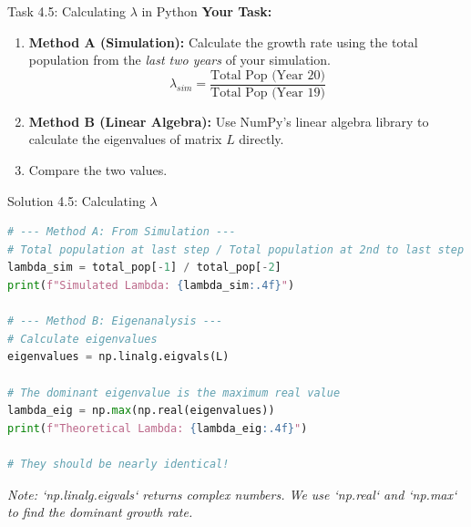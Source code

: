 \begin{frame}{Task 4.5: Calculating $\lambda$ in Python}
    \textbf{Your Task:}
    \begin{enumerate}
        \item \textbf{Method A (Simulation):} Calculate the growth rate using the total population from the \textit{last two years} of your simulation.
        $$ \lambda_{sim} = \frac{\text{Total Pop (Year 20)}}{\text{Total Pop (Year 19)}} $$
        
        \item \textbf{Method B (Linear Algebra):} Use NumPy's linear algebra library to calculate the eigenvalues of matrix $L$ directly.
        \item Compare the two values.
    \end{enumerate}
\end{frame}

\begin{frame}[fragile]{Solution 4.5: Calculating $\lambda$}
\small
\begin{lstlisting}[language=Python]
# --- Method A: From Simulation ---
# Total population at last step / Total population at 2nd to last step
lambda_sim = total_pop[-1] / total_pop[-2]
print(f"Simulated Lambda: {lambda_sim:.4f}")

# --- Method B: Eigenanalysis ---
# Calculate eigenvalues
eigenvalues = np.linalg.eigvals(L)

# The dominant eigenvalue is the maximum real value
lambda_eig = np.max(np.real(eigenvalues))
print(f"Theoretical Lambda: {lambda_eig:.4f}")

# They should be nearly identical!
\end{lstlisting}
\vspace{1em}
\footnotesize
\textit{Note: `np.linalg.eigvals` returns complex numbers. We use `np.real` and `np.max` to find the dominant growth rate.}
\end{frame}